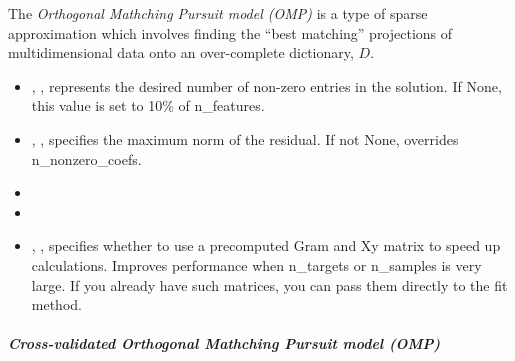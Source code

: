 The \textit{Orthogonal Mathching Pursuit model (OMP)} is a type of sparse
approximation which involves finding the ``best matching'' projections of
multidimensional data onto an over-complete dictionary, $D$.
%
\begin{itemize}
  \item {}, , represents
  the desired number of non-zero entries in the solution.
  If None, this value is set to 10\% of n\_features.
  \item {}, , specifies the maximum
  norm of the residual.
  If not None, overrides n\_nonzero\_coefs.
  \item {}
  \item {}
  \item {}, , specifies
  whether to use a precomputed Gram and Xy matrix to speed up calculations.
  Improves performance when n\_targets or n\_samples is very large.
  \nb If you already have such matrices, you can pass them directly to the
  fit method.
\end{itemize}
\subparagraph{Cross-validated Orthogonal Mathching Pursuit model (OMP)}
\mbox{}

